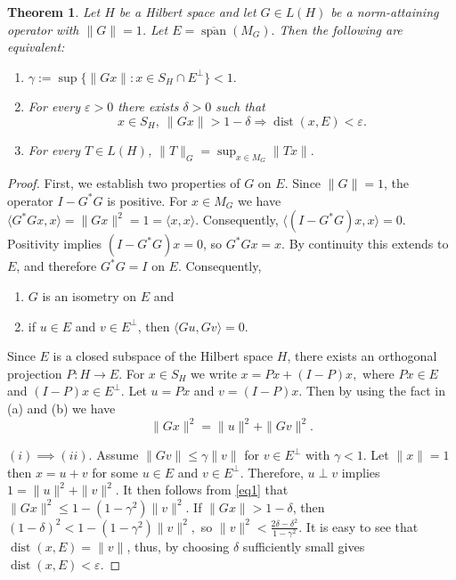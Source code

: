\documentclass[12pt]{amsart}
\newtheorem{theorem}{Theorem}[section]
\theoremstyle{definition}
\numberwithin{equation}{section}
\begin{document}
	
	\begin{theorem}\label{Th3.12}
		Let $H$ be a Hilbert space and let 
		$G \in L(H)$ be a norm-attaining operator with $\|G\|=1$. Let $E = \overline{\operatorname{span}}(M_G).$ Then the following are equivalent:
		\begin{enumerate}
			\item[(i)] $\gamma := \sup\{\|Gx\| : x \in S_H \cap E^\perp\} < 1.$
			\item[(ii)] For every $\varepsilon>0$ there exists $\delta>0$ such that
			\[
			x\in S_H,\ \|Gx\|>1-\delta \Longrightarrow \operatorname{dist}(x,E)<\varepsilon.
			\]
			\item[(iii)] For every $T\in L(H)$,
			$\|T\|_G = \sup_{x\in M_G}\|Tx\|.$
		\end{enumerate}
	\end{theorem}
	\begin{proof}
		First, we establish two properties of $G$ on $E$. Since $\|G\|=1$, the operator $I-G^*G$ is positive. For $x\in M_G$ we have $\langle G^*Gx,x\rangle=\|Gx\|^2=1=\langle x, x\rangle.$ Consequently, $\langle (I-G^*G)x,x\rangle=0$. Positivity implies $(I-G^*G)x=0$, so $G^*Gx=x$. By continuity this extends to $E$, and therefore $G^*G=I$ on $E.$ Consequently,
		\begin{enumerate}
			\item[(a)] $G$ is an isometry on $E$ and
			\item[(b)] if $u\in E$ and $v\in E^\perp$, then $\langle Gu,Gv\rangle=0$.
		\end{enumerate}
		Since $E$ is a closed subspace of the Hilbert space $H$, there exists an orthogonal projection $P:H\to E$. For $x\in S_H$ we write $x = Px + (I-P)x,$ where $Px\in E$ and $(I-P)x\in E^\perp$. Let $u=Px$ and $v=(I-P)x$. Then by using the fact in (a) and (b) we have
		\begin{equation}\label{eq1}
			\|Gx\|^2=\|u\|^2+\|Gv\|^2 .
		\end{equation}
		
		
		\medskip
		\noindent
		$(i)\implies (ii)$. Assume $\|Gv\|\le \gamma\|v\|$ for $v\in E^\perp$ with $\gamma<1$. Let $\|x\|=1$ then $x=u+v$ for some $u\in E$ and $v\in E^\perp$. Therefore, $u\perp v$ implies $1=\|u\|^2+\|v\|^2$. It then follows from \eqref{eq1} that $\|Gx\|^2\le 1-(1-\gamma^2)\|v\|^2.$ If $\|Gx\|>1-\delta$, then $(1-\delta)^2<1-(1-\gamma^2)\|v\|^2,$ so $\|v\|^2<\frac{2\delta-\delta^2}{1-\gamma^2}.$ It is easy to see that $\operatorname{dist}(x, E)=\|v\|$, thus, by choosing $\delta$ sufficiently small gives $\operatorname{dist}(x,E)<\varepsilon$.
		

\end{proof}
\end{document}
